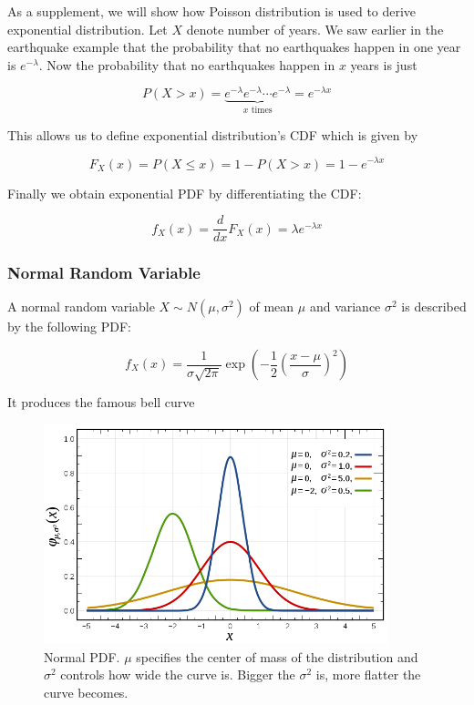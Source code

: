 \documentclass[12pt, a4paper]{article}
\newcounter{exa}
\begin{document}
As a supplement, we will show how Poisson distribution is used to derive exponential distribution. Let $X$ denote number of years. We saw earlier in the earthquake example that the probability that no earthquakes happen in one year is $e^{-\lambda}$. Now the probability that no earthquakes happen in $x$ years is just

$$P(X>x)=\underbrace{e^{-\lambda}e^{-\lambda}\cdots e^{-\lambda}}_{\text{$x$ times}}=e^{-\lambda x}$$

This allows us to define exponential distribution's CDF which is given by

$$F_X(x)=P(X\le x)=1-P(X>x)=1-e^{-\lambda x}$$

Finally we obtain exponential PDF by differentiating the CDF:

$$f_X(x)=\frac{d}{dx}F_X(x)=\lambda e^{-\lambda x}$$

\subsubsection{Normal Random Variable}

A normal random variable $X\sim N(\mu,\sigma^2)$ of mean $\mu$ and variance $\sigma^2$ is described by the following PDF:

$$f_X(x)=\frac{1}{\sigma\sqrt{2\pi}}\exp\left(-\frac12 \left( \frac{x-\mu}{\sigma} \right)^2\right)$$

It produces the famous bell curve

\begin{figure}[H]
\centering
\includegraphics[width=100mm]{15.png}
\caption{Normal PDF. $\mu$ specifies the center of mass of the distribution and $\sigma^2$ controls how wide the curve is. Bigger the $\sigma^2$ is, more flatter the curve becomes.}
\end{figure}
\end{document}
